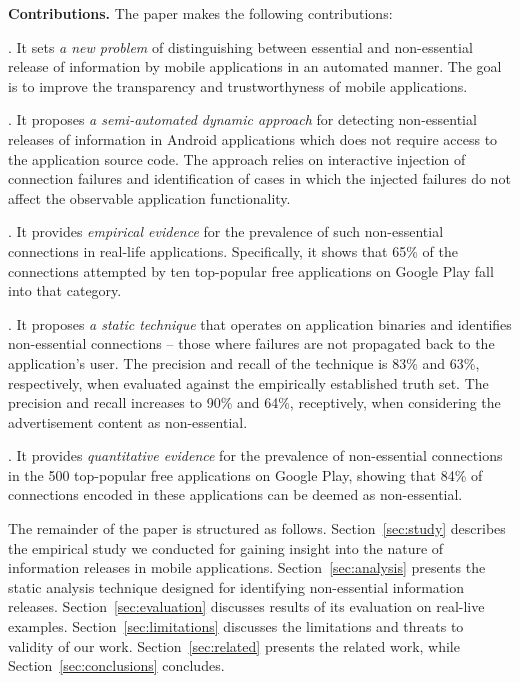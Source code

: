 \vspace{0.1in}
\noindent 
{\bf Contributions.}
The paper makes the following contributions:

.
It sets \emph{a new problem} of distinguishing between essential and non-essential release of information by mobile applications in an automated manner. The goal is to improve the
transparency and trustworthyness of mobile applications.

.
It proposes \emph{a semi-automated dynamic approach} for detecting non-essential releases of information in Android applications which does not require access to the application source code. 
The approach relies on interactive injection of connection failures and identification of cases in which the injected failures do not affect the observable application functionality. 

.
It provides \emph{empirical evidence} for the prevalence of such non-essential connections in real-life applications. Specifically, it shows that 65\% of the connections attempted by ten top-popular free applications on Google Play fall into that category.    

.
It proposes \emph{a static technique} that operates on application binaries and identifies non-essential connections -- those where failures are not propagated back to the application's user. The precision and recall of the technique is 83\% and 63\%, respectively, when evaluated against the empirically established truth set. 
The precision and recall increases to 90\% and 64\%, receptively, when considering the advertisement content as non-essential.

.
It provides \emph{quantitative evidence} for the prevalence of non-essential connections in the 500 top-popular free applications on Google Play, showing that 84\% of connections encoded in these applications can be deemed as non-essential.

The remainder of the paper is structured as follows. Section~\ref{sec:study} describes the empirical study we conducted for gaining insight into the nature of information releases in mobile applications. Section~\ref{sec:analysis} presents the static analysis technique designed for identifying non-essential information releases. 
Section~\ref{sec:evaluation} discusses results of its evaluation on real-live examples. Section~\ref{sec:limitations} discusses the limitations and threats to validity of our work. Section~\ref{sec:related} presents the related work, while Section~\ref{sec:conclusions} concludes. 



